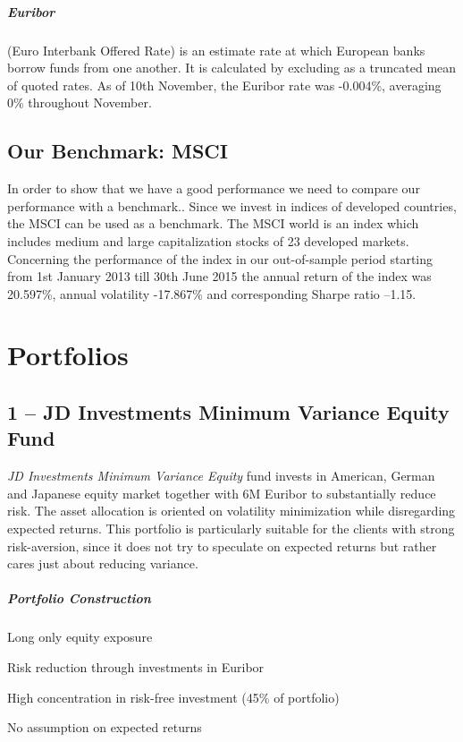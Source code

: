 \documentclass{scrreprt}
\begin{document}
 
\paragraph{Euribor} (Euro Interbank Offered Rate) is an estimate rate at which European banks borrow funds from one another.
It is calculated by excluding as a truncated mean of quoted rates.
As of 10th November, the Euribor rate was -0.004\%, averaging 0\% throughout November.

\section*{Our Benchmark: MSCI}
In order to show that we have a good performance we need to compare our performance with a benchmark.. Since we invest in indices of developed countries, the MSCI can be used as a benchmark. The MSCI world is an index  which includes medium and large capitalization stocks of 23 developed markets. Concerning the performance of the index in our out-of-sample period starting from 1st January 2013 till 30th June 2015 the annual return of the index was 20.597\%, annual volatility -17.867\% and corresponding Sharpe ratio –1.15.


\chapter*{Portfolios}

\section*{1 -- JD Investments Minimum Variance Equity Fund}
\textit{JD Investments Minimum Variance Equity} fund invests in American, German and Japanese equity market together with 6M Euribor to substantially reduce risk.
The asset allocation is oriented on volatility minimization while disregarding expected returns.
This portfolio is particularly suitable for the clients with strong risk-aversion, since it does not try to speculate on expected returns but rather cares just about reducing variance.

\paragraph{Portfolio Construction}
\begin{sit}
\item Long only equity exposure
\item Risk reduction through investments in Euribor
\item High concentration in risk-free investment (45\% of portfolio)
\item No assumption on expected returns
\end{sit}
\end{document}
